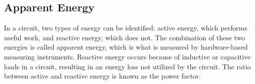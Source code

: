 \subsection{Apparent Energy}

In a circuit, two types of energy can be identified: active energy, which performs useful work, and reactive energy, which does not. The combination of these two energies is called apparent energy, which is what is measured by hardware-based measuring instruments. Reactive energy occurs because of inductive or capacitive loads in a circuit, resulting in an energy loss not utilized by the circuit\cite{ReactP}. The ratio between active and reactive energy is known as the power factor\cite{ReactP}.
